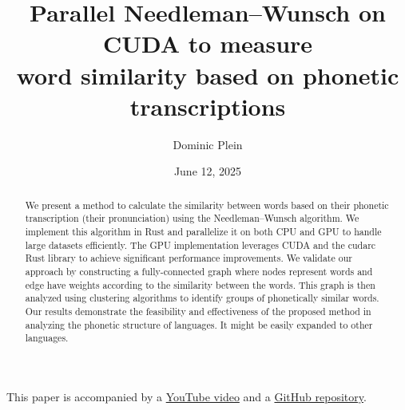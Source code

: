 \documentclass[10pt,a4paper,english]{article}
\title{\vspace{-0.0em}Parallel Needleman–Wunsch on CUDA to measure\\
word similarity based on phonetic transcriptions}
\author{Dominic Plein}
\date{June 12, 2025}
\newcommand{\abstractText}{\noindent
	\newline\noindent
    We present a method to calculate the similarity between words based on their phonetic transcription (their pronunciation) using the Needleman–Wunsch algorithm. We implement this algorithm in Rust and parallelize it on both CPU and GPU to handle large datasets efficiently. The GPU implementation leverages CUDA and the cudarc Rust library to achieve significant performance improvements. We validate our approach by constructing a fully-connected graph where nodes represent words and edge have weights according to the similarity between the words. This graph is then analyzed using clustering algorithms to identify groups of phonetically similar words. Our results demonstrate the feasibility and effectiveness of the proposed method in analyzing the phonetic structure of languages. It might be easily expanded to other languages.
}
\begin{document}
\setlength{\abovedisplayskip}{0.2em}

\maketitle

\begin{abstract}
    \abstractText
    \newline
    \newline
\end{abstract}

\vspace{-2em}
\begin{center}
    This paper is accompanied by a \href{https://youtu.be/xbcpnItE3_4}{YouTube video} and a \href{https://github.com/Splines/phonetics-graph/}{GitHub repository}.
\end{center}

\begin{multicols*}{2}
\tableofcontents

\newcolumn


\vfill\null
\columnbreak




\end{multicols*}

\renewcommand*{\glsgroupskip}{} %
\printglossary[type=\acronymtype]

\printbibliography[
    heading=bibintoc,
    title={Bibliography},
    keyword={lit}
]
\printbibliography[
    title={Data sources \& Tools},
    keyword={data}
]
\end{document}
